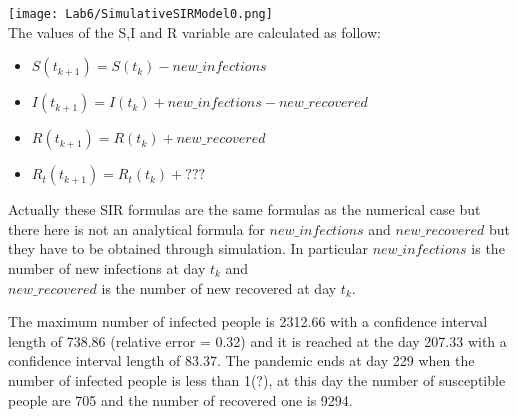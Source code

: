 \documentclass[twocolumn,letterpaper]{report}
\begin{document}
{					
	 						\texttt{[image: Lab6/SimulativeSIRModel0.png]} \\
								The values of the S,I and R variable are calculated as follow:
								\begin{itemize}
								  \item[] \hspace{5cm} $S(t_{k+1}) = S(t_{k}) - new\_infections$
									\item[] \hspace{5cm} $I(t_{k+1}) = I(t_{k}) + new\_infections - new\_recovered$
									\item[] \hspace{5cm} $R(t_{k+1}) = R(t_{k}) + new\_recovered$
									\item[] \hspace{5cm} $R_t(t_{k+1}) = R_t(t_{k}) + ???$
			 					\end{itemize}
			 Actually these SIR formulas are the same formulas as the numerical case but there here is not an analytical formula for $new\_infections$ and $new\_recovered$ but they have to be obtained through simulation.
			 In particular $new\_infections$ is the number of new infections at day $t_k$ and \\
			  $new\_recovered$ is the number of new recovered at day  $t_k$.
			  								
			The maximum number of infected people is 2312.66 with a confidence interval length of 738.86 (relative error = 0.32) and it is reached at the day 207.33 with a confidence interval length of 83.37. The pandemic ends at day 229 when the number of infected people is less than 1(?), at this day the number of susceptible people are 705 and the number of recovered one is 9294.
			 
			 
} \fi
\end{document}
